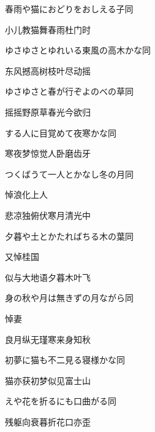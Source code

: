 \begin{haiku}
    {\FH 春雨や猫におどりをおしえる子}\hfill{\FH 同}

    {\FK 小儿教猫舞春雨杜门时}
\end{haiku}

\begin{haiku}
    {\FH ゆさゆさとゆれいる東風の高木かな}\hfill{\FH 同}

    {\FK 东风撼高树枝叶尽动摇}
\end{haiku}

\begin{haiku}
    {\FH ゆさゆさと春が行ぞよのべの草}\hfill{\FH 同}

    {\FK 摇摇野原草春光今欲归}
\end{haiku}

\begin{haiku}
    {\FH {}する人に目覚めて夜寒かな}\hfill{\FH 同}

    {\FK 寒夜梦惊觉人卧磨齿牙}
\end{haiku}

\begin{haiku}
    {\FH つくばうて一人とかなし冬の月}\hfill{\FH 同}

    {\FK 悼浪化上人}

    {\FK 悲凉独俯伏寒月清光中}
\end{haiku}

\begin{haiku}
    {\FH 夕暮や土とかたればちる木の葉}\hfill{\FH 同}

    {\FK 又悼桂国}

    {\FK 似与大地语夕暮木叶飞}
\end{haiku}

\begin{haiku}
    {\FH 身の秋や月は無きずの月ながら}\hfill{\FH 同}

    {\FK 悼妻}

    {\FK 良月纵无瑾寒来身知秋}
\end{haiku}

\begin{haiku}
    {\FH 初夢に猫も不二見る寝様かな}\hfill{\FH 同}

    {\FK 猫亦获初梦似见富士山}
\end{haiku}

\begin{haiku}
    {\FH {}えや花を折るにも口曲がる}\hfill{\FH 同}

    {\FK 残躯向衰暮折花口亦歪}
\end{haiku}

